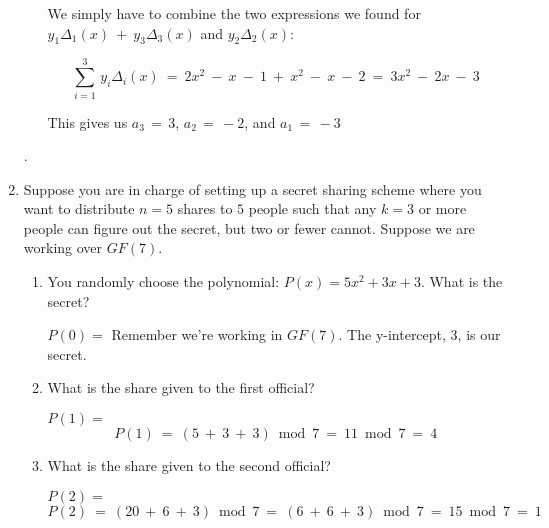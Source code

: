 \documentclass[11pt, preview]{standalone} %
\begin{document}
\begin{enumerate}
\begin{enumerate}
\begin{Freeform}{-3}
\Solution We simply have to combine the two expressions we found for $y_1 \Delta_1(x)\ +\ y_3 \Delta_3(x)$ and $y_2 \Delta_2(x)$:

$$\sum_{i = 1}^{3}\, y_i \Delta_i(x)\ =\ 2x^2\ -\ x\ -\ 1\ +\ x^2\ -\ x\ -\ 2\ =\ 3 x^2\ -\ 2x\ -\ 3$$

This gives us $a_3\, =\, 3$, $a_2\, =\, -2$, and $a_1\, =\, -3$
\end{Freeform}

\end{enumerate}

.
\item Suppose you are in charge of setting up a secret sharing scheme where you want to distribute $n = 5$ shares to $5$ people such that any $k = 3$ or more people can figure out the secret, but two or fewer cannot. Suppose we are working over $GF(7)$.
\begin{enumerate}

 \item You randomly choose the polynomial: $P(x) = 5x^2 + 3x + 3$. What is the secret?
 \begin{Freeform}{3}
 $P(0) = $
 \Hint Remember we're working in $GF(7)$.
 \Solution The y-intercept, $3$, is our secret.
 \end{Freeform}
 
 \item What is the share given to the first official?
 \begin{Freeform}{4}
 $P(1) = $ 
 \Solution $$P(1)\ =\ (5\ +\ 3\ +\ 3) \bmod 7\ =\ 11 \bmod 7\ =\ 4$$
 \end{Freeform}
 
 \item What is the share given to the second official?
 \begin{Freeform}{1}
 $P(2) = $
 \Solution $$P(2)\ =\ (20\ +\ 6\ +\ 3) \bmod 7\ =\ (6\ +\ 6\ +\ 3) \bmod 7\ =\ 15 \bmod 7\ =\ 1$$
 \end{Freeform}
 

\end{enumerate}
\end{enumerate}
\end{document}
